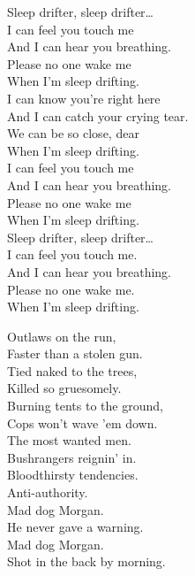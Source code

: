 Sleep drifter, sleep drifter… \\

I can feel you touch me \\
And I can hear you breathing. \\
Please no one wake me \\
When I'm sleep drifting. \\

I can know you're right here \\
And I can catch your crying tear. \\
We can be so close, dear \\
When I'm sleep drifting. \\

I can feel you touch me \\
And I can hear you breathing. \\
Please no one wake me \\
When I'm sleep drifting. \\

Sleep drifter, sleep drifter… \\

I can feel you touch me. \\
And I can hear you breathing. \\
Please no one wake me. \\
When I'm sleep drifting. \\





Outlaws on the run, \\
Faster than a stolen gun. \\
Tied naked to the trees, \\
Killed so gruesomely. \\
Burning tents to the ground, \\
Cops won't wave 'em down. \\
The most wanted men. \\
Bushrangers reignin' in. \\

Bloodthirsty tendencies. \\
Anti-authority. \\

Mad dog Morgan. \\
He never gave a warning. \\
Mad dog Morgan. \\
Shot in the back by morning. \\


